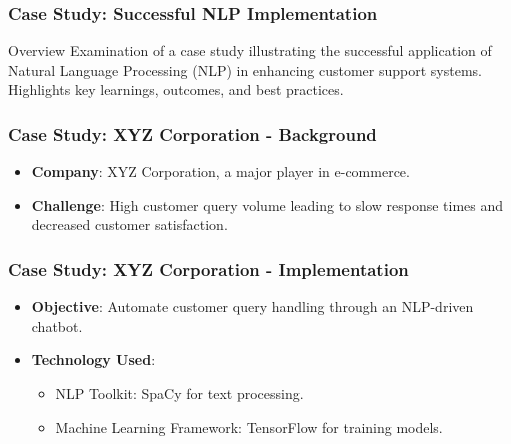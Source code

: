 \documentclass[aspectratio=169]{beamer}
\begin{document}
\begin{frame}
    \frametitle{Case Study: Successful NLP Implementation}
    \begin{block}{Overview}
        Examination of a case study illustrating the successful application of Natural Language Processing (NLP) in enhancing customer support systems.
        Highlights key learnings, outcomes, and best practices.
    \end{block}
\end{frame}

\begin{frame}
    \frametitle{Case Study: XYZ Corporation - Background}
    \begin{itemize}
        \item \textbf{Company}: XYZ Corporation, a major player in e-commerce.
        \item \textbf{Challenge}: High customer query volume leading to slow response times and decreased customer satisfaction.
    \end{itemize}
\end{frame}

\begin{frame}
    \frametitle{Case Study: XYZ Corporation - Implementation}
    \begin{itemize}
        \item \textbf{Objective}: Automate customer query handling through an NLP-driven chatbot.
        \item \textbf{Technology Used}:
            \begin{itemize}
                \item NLP Toolkit: SpaCy for text processing.
                \item Machine Learning Framework: TensorFlow for training models.
            \end{itemize}
    \end{itemize}
\end{frame}
\end{document}
